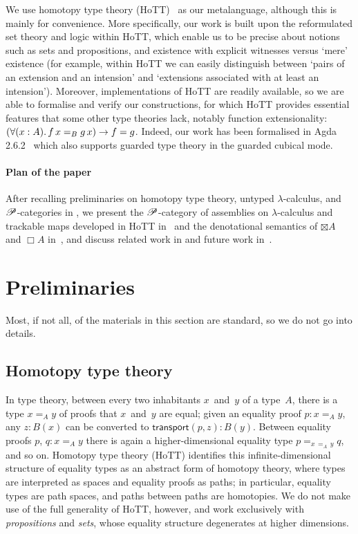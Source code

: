 \documentclass[draft,a4paper,UKenglish,numberwithinsect,cleveref,thm-restate]{lipics-v2021}
\numberwithin{equation}{section}
\theoremstyle{definition}
\theoremstyle{plain}
\begin{document}
We use homotopy type theory (HoTT)~\cite{hottbook} as our metalanguage, although this is mainly for convenience.
More specifically, our work is built upon the reformulated set theory and logic within HoTT, which enable us to be precise about notions such as sets and propositions, and existence with explicit witnesses versus `mere' existence (for example, within HoTT we can easily distinguish between `pairs of an extension and an intension' and `extensions associated with at least an intension').
Moreover, implementations of HoTT are readily available, so we are able to formalise and verify our constructions, for which HoTT provides essential features that some other type theories lack, notably function extensionality: $\left(\fall{x : A} f\,x =_B g\,x\right) \to f = g$.
Indeed, our work has been formalised in Agda 2.6.2~\cite{Agda} which also supports guarded type theory in the guarded cubical mode.


\paragraph*{Plan of the paper}
After recalling preliminaries on homotopy type theory, untyped $\lambda$-calculus, and $\mathscr{P}$-categories in , we present the $\mathscr{P}$-category of assemblies on $\lambda$-calculus and trackable maps developed in HoTT in~ and the denotational semantics of $\boxtimes A$ and $\Box A$ in~, and discuss related work in  and future work in~.

\section{Preliminaries}\label{sec:preliminaries}
Most, if not all, of the materials in this section are standard, so we do not go into details.

\subsection{Homotopy type theory}
In type theory, between every two inhabitants $x$~and~$y$ of a type~$A$, there is a type $x =_A y$ of proofs that $x$~and~$y$ are equal; given an equality proof $p : x =_A y$, any $z : B(x)$ can be converted to $\mathsf{transport}(p, z) : B(y)$.
Between equality proofs $p$, $q : x =_A y$ there is again a higher-dimensional equality type $p =_{x\,{=_A}\,y} q$, and so on.
Homotopy type theory (HoTT) identifies this infinite-dimensional structure of equality types as an abstract form of homotopy theory, where types are interpreted as spaces and equality proofs as paths; in particular, equality types are path spaces, and paths between paths are homotopies.
We do not make use of the full generality of HoTT, however, and work exclusively with \emph{propositions} and \emph{sets}, whose equality structure degenerates at higher dimensions.
\end{document}
